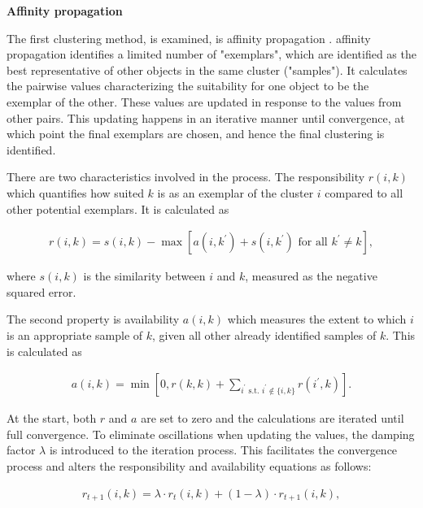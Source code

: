 \documentclass[a4paper,12pt]{article}
\begin{document}
\textbf{Affinity propagation}

The first clustering method, is examined, is affinity propagation \citep{freyDueck07}. affinity propagation identifies a limited number of "exemplars", which are identified as the best representative of other objects in the same cluster ("samples"). It calculates the pairwise values characterizing the suitability for one object to be the exemplar of the other. These values are updated in response to the values from other pairs. This updating happens in an iterative manner until convergence, at which point the final exemplars are chosen, and hence the final clustering is identified.

There are two characteristics involved in the process. The responsibility $r\left(i,k\right)$ which quantifies how suited $k$ is as an exemplar of the cluster $i$ compared to all other potential exemplars. It is calculated as

\begin{align}\label{eq:affinityPropagationExemplars}
    r\left(i,k\right) = s\left(i,k\right) - \max\left[a\left(i,k^\prime\right) + s\left(i,k^\prime\right) \text{ for all } k^\prime \neq k\right],
\end{align}

where $s\left(i,k\right)$ is the similarity between $i$ and $k$, measured as the negative squared error.

The second property is availability $a\left(i,k\right)$ which measures the extent to which $i$ is an appropriate sample of $k$, given all other already identified samples of $k$. This is calculated as

\begin{align}\label{eq:availabilityAffinityPropagation}
    a\left(i,k\right) = \min\left[0, r\left(k,k\right) + \sum_{i^\prime \text{ s.t. } i^\prime \notin \{i,k\}} r\left(i^\prime,k\right)\right].
\end{align}

At the start, both $r$ and $a$ are set to zero and the calculations are iterated until full convergence. To eliminate oscillations when updating the values, the damping factor $\lambda$ is introduced to the iteration process. This facilitates the convergence process and alters the responsibility and availability equations as follows:

\begin{align}\label{eq:responsibilityAffinityPropagation}
    r_{t+1}\left(i,k\right) = \lambda \cdot r_t\left(i,k\right) + (1-\lambda) \cdot r_{t+1}\left(i,k\right),
\end{align}
\end{document}
